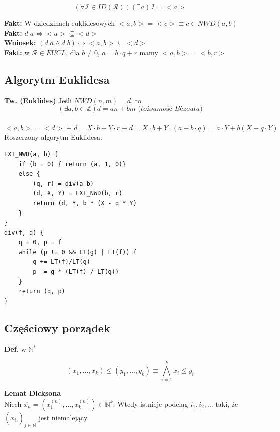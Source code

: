 \documentclass{article}
\numberwithin{equation}{subsection}
\begin{document}
\[ (\forall \mathcal{I} \in ID(\mathcal{R}))(\exists a) \mathcal{I} = <a> \]

\noindent
\textbf{Fakt:} W dziedzinach euklidesowych $<a,b> = <c> \equiv c \in NWD(a, b)$ \\

\noindent
\textbf{Fakt:} $d | a \iff <a> \subseteq <d>$ \\
\textbf{Wniosek:} $(d|a \land d |b) \iff <a,b> \subseteq <d>$ \\

\noindent
\textbf{Fakt:} w $\mathcal{R} \in EUCL$, dla $b \neq 0$, $a = b \cdot q + r$ mamy $<a,b> = <b,r>$ \\

\subsection{Algorytm Euklidesa}

\noindent
\textbf{Tw. (Euklides)} Jeśli $NWD(n,m) = d$, to 
\[ (\exists a,b \in \mathbb{Z}) d = an + bm  \textit{ (tożsamość Bézouta)}\] \\

\noindent
$<a, b> = <d> \equiv d = X \cdot b + Y \cdot r \equiv d = X \cdot b + Y \cdot ( a - b \cdot q) = a \cdot Y + b(X - q \cdot Y)$ \\

\noindent
Roszerzony algorytm Euklidesa: 
\begin{verbatim}
EXT_NWD(a, b) {
    if (b = 0) { return (a, 1, 0)}
    else {
        (q, r) = div(a b)
        (d, X, Y) = EXT_NWD(b, r)
        return (d, Y, b * (X - q * Y)
    }
}   
div(f, q) {
    q = 0, p = f
    while (p != 0 && LT(g) | LT(f)) {
        q += LT(f)/LT(g)
        p -= g * (LT(f) / LT(g))
    }
    return (q, p)
}
\end{verbatim}

\subsection{Częściowy porządek}

\textbf{Def.} w $\mathbb{N}^k$ 

\[ (x_1, \dots, x_k) \leq (y_1, \dots, y_k) \equiv \bigwedge_{i=1}^k x_i \leq y_i \]

\noindent
\textbf{Lemat Dicksona} \\
Niech $\overline{x_n} = (x_1^{(n)}, \dots, x_k^{(n)}) \in \mathbb{N}^k$. Wtedy istnieje podciąg $i_1, i_2, \dots$ taki, że $(\overline{x_{i_j}})_{j \in \mathbb{N}}$ jest niemalejący. \\
\end{document}
